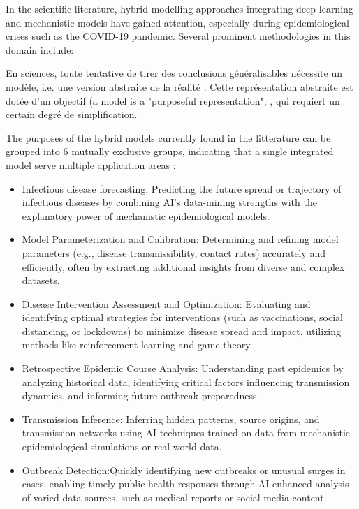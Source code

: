 In the scientific literature, hybrid modelling approaches integrating deep learning and mechanistic models have gained attention, especially during epidemiological crises such as the COVID-19 pandemic. Several prominent methodologies in this domain include:

En sciences, toute tentative de tirer des conclusions généralisables nécessite un
modèle, i.e. une version abstraite de la réalité \cite{McCallum2008}. Cette représentation
abstraite est dotée d’un objectif (a model is a "purposeful representation", 
\cite{Starfield1990}, qui requiert un certain degré de simplification.

The purposes of the hybrid models currently found in the litterature can be grouped into 6 mutually exclusive groups, indicating that a single integrated model serve multiple application areas \cite{Ye2025} :
\begin{itemize}
    \item Infectious disease forecasting: Predicting the future spread or trajectory of infectious diseases by combining AI's data-mining strengths with the explanatory power of mechanistic epidemiological models. \cite{Poirier2020, Fan2022, Garner2016, Kharazmi2021, Barmparis2022}
    \item Model Parameterization and Calibration: Determining and refining model parameters (e.g., disease transmissibility, contact rates) accurately and efficiently, often by extracting additional insights from diverse and complex datasets. \cite{Tuarob2015, SolaresHernandez2023, Reiker2021, Jorgensen2022, Raissi2019}
    \item Disease Intervention Assessment and Optimization: Evaluating and identifying optimal strategies for interventions (such as vaccinations, social distancing, or lockdowns) to minimize disease spread and impact, utilizing methods like reinforcement learning and game theory. \cite{Thiagarajan2022, Bertsimas2021, Aurell2022, Janko2023}
    \item Retrospective Epidemic Course Analysis: Understanding past epidemics by analyzing historical data, identifying critical factors influencing transmission dynamics, and informing future outbreak preparedness. \cite{Ruth2022, Santermans2015, Sanson2022, Weyant2023}
    \item Transmission Inference: Inferring hidden patterns, source origins, and transmission networks using AI techniques trained on data from mechanistic epidemiological simulations or real-world data. \cite{Ling2022, Colijn2014, Vilar2023}
    \item Outbreak Detection:Quickly identifying new outbreaks or unusual surges in cases, enabling timely public health responses through AI-enhanced analysis of varied data sources, such as medical reports or social media content.
\end{itemize}


